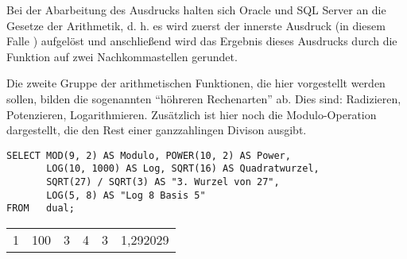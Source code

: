        Bei der Abarbeitung des Ausdrucks 
        halten sich Oracle und SQL Server an die Gesetze der Arithmetik, d. h.
        es wird zuerst der innerste Ausdruck (in diesem Falle
        ) aufgelöst und anschließend wird das
        Ergebnis dieses Ausdrucks durch die Funktion  auf
        zwei Nachkommastellen gerundet.

        Die zweite Gruppe der arithmetischen Funktionen, die hier vorgestellt
        werden sollen, bilden die sogenannten \enquote{höhreren Rechenarten}
        ab. Dies sind: Radizieren, Potenzieren, Logarithmieren. Zusätzlich ist
        hier noch die Modulo-Operation dargestellt, die den Rest einer
        ganzzahlingen Divison ausgibt.
        \begin{lstlisting}[language=oracle_sql,caption={Höhere Rechenarten in Oracle},label=sql03_17]
SELECT MOD(9, 2) AS Modulo, POWER(10, 2) AS Power,
       LOG(10, 1000) AS Log, SQRT(16) AS Quadratwurzel,
       SQRT(27) / SQRT(3) AS "3. Wurzel von 27",
       LOG(5, 8) AS "Log 8 Basis 5"
FROM   dual;
        \end{lstlisting}
        \begin{center}
          \begin{small}
            \tablehead{}
            \begin{oraclesql}
              \begin{supertabular}{rrrrrr}
                1 & 100 & 3 & 4 & 3 & 1,292029 \\
              \end{supertabular}
            \end{oraclesql}
          \end{small}
        \end{center}
